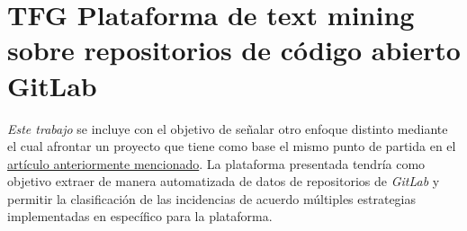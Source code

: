 \section{TFG Plataforma de text mining sobre repositorios de código abierto GitLab}
\emph{Este trabajo} \cite{related_works:tfg_text_mining_gitlab} se incluye con el objetivo de señalar otro enfoque distinto mediante el cual afrontar un proyecto que tiene como base el mismo punto de partida en el \hyperref[sec:labelpredictionarticle]{artículo anteriormente mencionado}. La plataforma presentada tendría como objetivo extraer de manera automatizada de datos de repositorios de \emph{GitLab} y permitir la clasificación de las incidencias de acuerdo múltiples estrategias implementadas en específico para la plataforma.